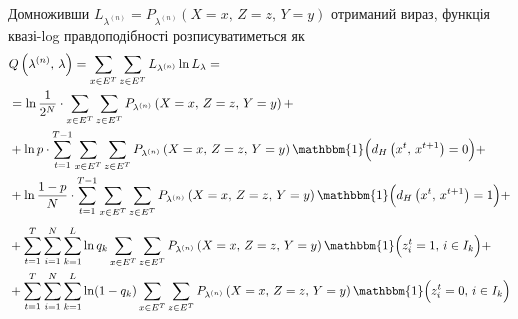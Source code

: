 Домноживши $L_{\lambda^{(n)}} = P_{\lambda^{(n)}} \left( X=x,\,Z=z,\,Y=y \right)$ отриманий вираз, функція квазі-log правдоподібності розписуватиметься як
\begin{align*}
    &Q\left( \lambda^{(n)},\,\lambda \right) = \sum\limits_{x \in E^T} \sum\limits_{z \in E^T} L_{\lambda^{(n)}} \ln L_{\lambda} = \\
    &= \ln \frac{1}{2^N} \cdot \sum\limits_{x \in E^T} \sum\limits_{z \in E^T} P_{\lambda^{(n)}} \left( X=x,\,Z=z,\,Y=y \right) + \\
    &+ \ln p \cdot \sum\limits_{t=1}^{T-1} \sum\limits_{x \in E^T} \sum\limits_{z \in E^T} P_{\lambda^{(n)}} \left( X=x,\,Z=z,\,Y=y \right) \mathbbm{1} \Bigl( d_H\left( x^t,\,x^{t+1} \right) = 0 \Bigr) + \\
    &+ \ln \frac{1-p}{N} \cdot \sum\limits_{t=1}^{T-1} \sum\limits_{x \in E^T} \sum\limits_{z \in E^T} P_{\lambda^{(n)}} \left( X=x,\,Z=z,\,Y=y \right) \mathbbm{1} \Bigl( d_H\left( x^t,\,x^{t+1} \right) = 1 \Bigr) +
\end{align*}
\begin{align*} 
    &+ \sum\limits_{t=1}^T \sum\limits_{i=1}^N \sum\limits_{k=1}^L \ln{q_k} \sum\limits_{x \in E^T} \sum\limits_{z \in E^T} P_{\lambda^{(n)}} \left( X=x,\,Z=z,\,Y=y \right) \mathbbm{1} \Bigl( z^t_i=1,\,i \in I_k \Bigr) + \\
    &+ \sum\limits_{t=1}^T \sum\limits_{i=1}^N \sum\limits_{k=1}^L \ln(1-q_k) \sum\limits_{x \in E^T} \sum\limits_{z \in E^T} P_{\lambda^{(n)}} \left( X=x,\,Z=z,\,Y=y \right) \mathbbm{1} \Bigl( z^t_i=0,\,i \in I_k \Bigr)
\end{align*}

